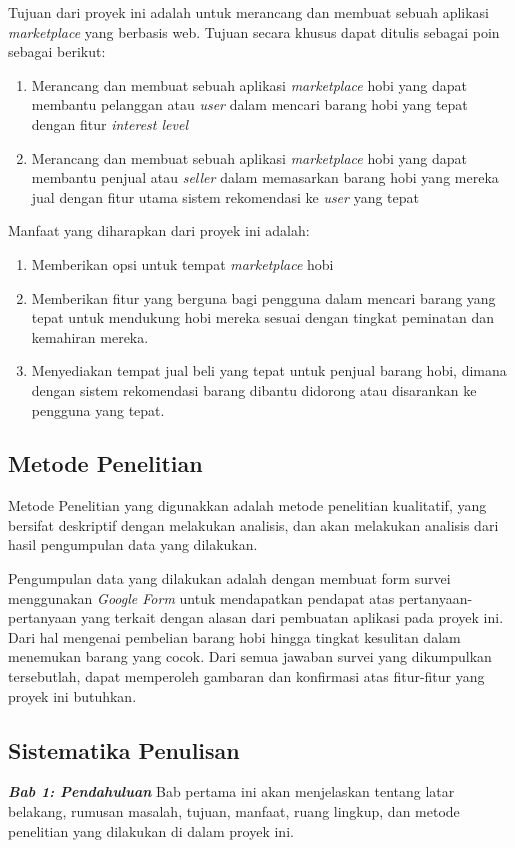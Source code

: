 \documentclass[a4paper]{article}
\newcommand{\subbab}[1]{%
    \subsection{#1}%
    \setcounter{figure}{0}
    \setcounter{table}{0}
}
\begin{document}
Tujuan dari proyek ini adalah untuk merancang dan membuat sebuah aplikasi \textit{marketplace} yang berbasis web. Tujuan secara khusus dapat ditulis sebagai poin sebagai berikut:
\begin{enumerate}
    \item Merancang dan membuat sebuah aplikasi \textit{marketplace} hobi yang dapat membantu pelanggan atau \textit{user} dalam mencari barang hobi yang tepat dengan fitur \textit{interest level}
    \item Merancang dan membuat sebuah aplikasi \textit{marketplace} hobi yang dapat membantu penjual atau \textit{seller} dalam memasarkan barang hobi yang mereka jual dengan fitur utama sistem rekomendasi ke \textit{user} yang tepat
\end{enumerate}

Manfaat yang diharapkan dari proyek ini adalah:
\begin{enumerate}
    \item Memberikan opsi untuk tempat \textit{marketplace} hobi
    \item Memberikan fitur yang berguna bagi pengguna dalam mencari barang yang tepat untuk mendukung hobi mereka sesuai dengan tingkat peminatan dan kemahiran mereka.
    \item Menyediakan tempat jual beli yang tepat untuk penjual barang hobi, dimana dengan sistem rekomendasi barang dibantu didorong atau disarankan ke pengguna yang tepat.
\end{enumerate}

\subbab{Metode Penelitian}

Metode Penelitian yang digunakkan adalah metode penelitian kualitatif, yang bersifat deskriptif dengan melakukan analisis\autocite{pengajar-kualitatif}, dan akan melakukan analisis dari hasil pengumpulan data yang dilakukan.


Pengumpulan data yang dilakukan adalah dengan membuat form survei menggunakan \textit{Google Form} untuk mendapatkan pendapat atas pertanyaan-pertanyaan yang terkait dengan alasan dari pembuatan aplikasi pada proyek ini. Dari hal mengenai pembelian barang hobi hingga tingkat kesulitan dalam menemukan barang yang cocok. Dari semua jawaban survei yang dikumpulkan tersebutlah, dapat memperoleh gambaran dan konfirmasi atas fitur-fitur yang proyek ini butuhkan.

\subbab{Sistematika Penulisan}
\textit{\textbf{Bab 1: Pendahuluan}} \newline
Bab pertama ini akan menjelaskan tentang latar belakang, rumusan masalah, tujuan, manfaat, ruang lingkup, dan metode penelitian yang dilakukan di dalam proyek ini.
\end{document}
